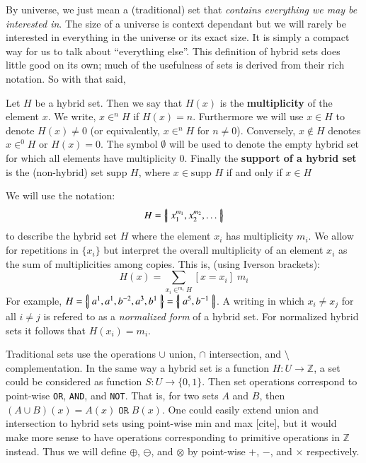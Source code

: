 By universe, we just mean a (traditional) set that \emph{contains everything we may be interested in}.
The size of a universe is context dependant but we will rarely be interested in everything in the universe or its exact size.
It is simply a compact way for us to talk about ``everything else''.
This definition of hybrid sets does little good on its own; much of the usefulness of sets is derived from their rich notation.
So with that said,


\begin{definition}
	Let $H$ be a hybrid set. 
	Then we say that $H(x)$ is the \textbf{multiplicity} of the element $x$. 
	We write, $x \in^n H$ if $H(x)=n$. 
	Furthermore we will use $x \in H$ to denote $H(x)\neq 0$ (or equivalently, $x \in^n H$ for $n\neq 0$).
	Conversely, $x \notin H$ denotes $x \in^0 H$ or $H(x)=0$.
	The symbol $\emptyset$ will be used to denote the empty hybrid set for which all elements have multiplicity 0.
	Finally the \textbf{support of a hybrid set} is the (non-hybrid) set $\text{supp }H$,
	where $x \in \text{supp }H$ if and only if $x \in H$
\end{definition}


We will use the notation:
\begin{equation*}
	H = \left\{ \! \left| \; x_1^{m_1}, x_2^{m_2},\ldots \; \right| \! \right\}
\end{equation*}
to describe the hybrid set $H$ where the element $x_i$ has multiplicity $m_i$. 
We allow for repetitions in $\{ x_i \}$ but interpret the overall multiplicity of an element $x_i$ as 
the sum of multiplicities among copies. This is, (using Iverson brackets):
\begin{equation}
	H(x) = \sum_{x_i \in^{m_i} H} [x = x_i] \; m_i
\end{equation}
For example, $H=\left\{ \! \left| \; a^1, a^1, b^{-2}, a^3, b^1 \; \right| \! \right\} = \left\{ \! \left| \; a^5, b^{-1} \; \right| \! \right\}$. 
A writing in which $x_i \neq x_j$ for all $i \neq j$ is refered to as a \emph{normalized form} of a hybrid set. 
For normalized hybrid sets it follows that $H(x_i) = m_i$.


Traditional sets use the operations $\cup$ union, $\cap$ intersection, and $\setminus$ complementation.
In the same way a hybrid set is a function $H : U \to \mathbb{Z}$, 
a set could be considered as function $S : U \to \{ 0,1 \}$.
Then set operations correspond to point-wise \texttt{OR}, \texttt{AND}, and \texttt{NOT}.
That is, for two sets $A$ and $B$, then $(A \cup B)(x) = A(x) \;\mathtt{OR}\; B(x)$.
One could easily extend union and intersection to hybrid sets using point-wise min and max
[cite],
but it would make more sense to have operations corresponding to primitive operations in $\mathbb{Z}$ instead.
Thus we will define $\oplus$, $\ominus$, and $\otimes$ by point-wise $+$, $-$, and $\times$ respectively.


